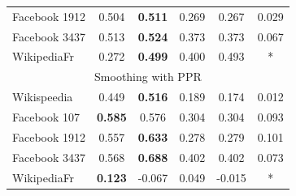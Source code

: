 \begin{table}[t]
\begin{center}
\begin{tabular}{l|c|c|c|c|c}
Facebook 1912 & 0.504 & \textbf{0.511} & 0.269 & 0.267 & 0.029\\
Facebook 3437 & 0.513 & \textbf{0.524} & 0.373 & 0.373 & 0.067\\
WikipediaFr  &  0.272 & \textbf{0.499} & 0.400 & 0.493 & *\\
\hline
\multicolumn{6}{c}{Smoothing with PPR}\\
\hline
Wikispeedia  &  0.449 & \textbf{0.516} & 0.189 & 0.174 & 0.012\\
Facebook 107 & \textbf{0.585} & 0.576 & 0.304 & 0.304 & 0.093 \\
Facebook 1912 & 0.557 & \textbf{0.633} & 0.278 & 0.279 & 0.101\\
Facebook 3437 & 0.568 & \textbf{0.688} & 0.402 & 0.402 & 0.073\\
WikipediaFr  &  \textbf{0.123} & -0.067 & 0.049 & -0.015 & *\\
\hline
        \end{tabular}
    \end{center}
    \label{tab:CISIP_scores}
\end{table}

